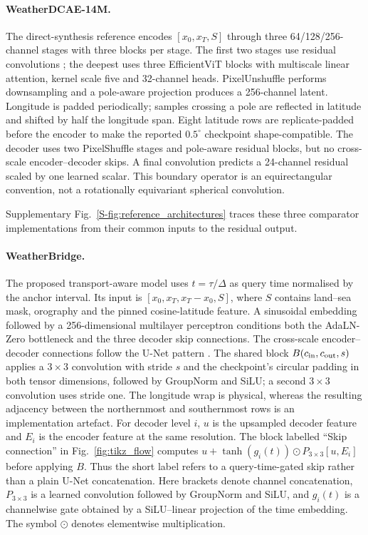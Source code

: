 \documentclass[referee,lineno,pdflatex,sn-nature]{sn-jnl}
\begin{document}
\begin{deferredmethodsintro}
\paragraph{WeatherDCAE-14M.}
The direct-synthesis reference encodes $[x_0,x_T,S]$ through three
64/128/256-channel stages with three blocks per stage. The first two stages use
residual convolutions \cite{he2016resnet}; the deepest uses three EfficientViT
blocks \cite{cai2023efficientvit} with
multiscale linear attention, kernel scale five and 32-channel heads.
PixelUnshuffle performs downsampling and a pole-aware projection produces a
256-channel latent. Longitude is padded periodically; samples crossing a pole
are reflected in latitude and shifted by half the longitude span. Eight
latitude rows are replicate-padded before the encoder to make the reported
$0.5^\circ$ checkpoint shape-compatible. The decoder uses two PixelShuffle
stages and pole-aware residual blocks, but no cross-scale encoder--decoder
skips. A final convolution predicts a 24-channel residual scaled by one
learned scalar. This boundary operator is an equirectangular convention, not
a rotationally equivariant spherical convolution.

Supplementary Fig.~\ref{S-fig:reference_architectures} traces these three
comparator implementations from their common inputs to the residual output.

\paragraph{WeatherBridge.}
The proposed transport-aware model uses $t=\tau/\Delta$ as query time
normalised by the anchor interval. Its input
is $[x_0,x_T,x_T-x_0,S]$, where $S$ contains land--sea mask, orography and the
pinned cosine-latitude feature. A sinusoidal embedding followed by a
256-dimensional multilayer perceptron conditions both the AdaLN-Zero
bottleneck and the three decoder skip connections. The cross-scale
encoder--decoder connections
follow the U-Net pattern \cite{ronneberger2015unet}. The shared block
$B(c_{\rm in},c_{\rm out},s)$ applies a $3\times3$ convolution with stride
$s$ and the checkpoint's circular padding in both tensor dimensions,
followed by GroupNorm \cite{wu2018groupnorm} and SiLU; a second $3\times3$
convolution uses stride
one. The longitude wrap is physical, whereas the resulting adjacency between
the northernmost and southernmost rows is an implementation artefact. For
decoder level $i$, $u$ is the upsampled decoder feature and
$E_i$ is the encoder feature at the same resolution. The block labelled
``Skip connection'' in Fig.~\ref{fig:tikz_flow} computes
$u+\tanh(g_i(t))\odot P_{3\times3}[u,E_i]$ before applying $B$. Thus the short
label refers to a query-time-gated skip rather than a plain U-Net
concatenation.
Here brackets denote channel concatenation, $P_{3\times3}$ is a learned
convolution followed by GroupNorm and SiLU, and $g_i(t)$ is a channelwise gate obtained
by a SiLU--linear projection of the time embedding. The symbol $\odot$
denotes elementwise multiplication.


\end{deferredmethodsintro}
\end{document}

